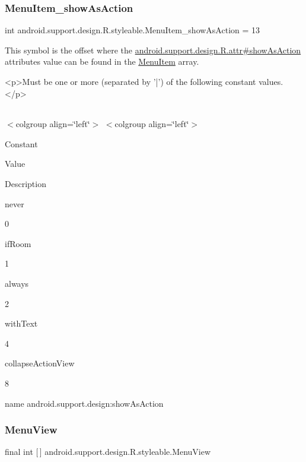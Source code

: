 \subsubsection{\texorpdfstring{Menu\+Item\+\_\+show\+As\+Action}{MenuItem\_showAsAction}}
{\footnotesize\ttfamily int android.\+support.\+design.\+R.\+styleable.\+Menu\+Item\+\_\+show\+As\+Action = 13\hspace{0.3cm}{\ttfamily [static]}}

This symbol is the offset where the \hyperlink{classandroid_1_1support_1_1design_1_1R_1_1attr_a8e31fca542d0605aaee166fed8a798b6}{android.\+support.\+design.\+R.\+attr\#show\+As\+Action} attribute\textquotesingle{}s value can be found in the \hyperlink{classandroid_1_1support_1_1design_1_1R_1_1styleable_a4c90afdbb461f2bfba191da26fbc881c}{Menu\+Item} array.

\begin{DoxyVerb}      <p>Must be one or more (separated by '|') of the following constant values.</p>
\end{DoxyVerb}
 \tabulinesep=1mm
\begin{longtabu} spread 0pt [c]{*{0}{|X[-1]}|}
\hline
\end{longtabu}
$<$colgroup align=\char`\"{}left\char`\"{}$>$ $<$colgroup align=\char`\"{}left\char`\"{}$>$ 

Constant

Value

Description 

{\ttfamily never}

0

{\ttfamily if\+Room}

1

{\ttfamily always}

2

{\ttfamily with\+Text}

4

{\ttfamily collapse\+Action\+View}

8

name android.\+support.\+design\+:show\+As\+Action \mbox{\label{classandroid_1_1support_1_1design_1_1R_1_1styleable_acaf80b4eb554eab1b6f3b7f929ac7039}} 
\subsubsection{\texorpdfstring{Menu\+View}{MenuView}}
{\footnotesize\ttfamily final int \mbox{[}$\,$\mbox{]} android.\+support.\+design.\+R.\+styleable.\+Menu\+View\hspace{0.3cm}{\ttfamily [static]}}

